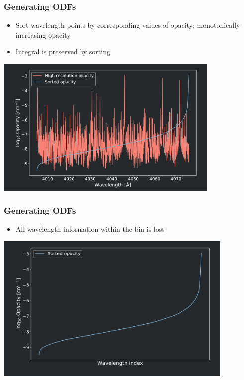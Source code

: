 \frame
{
	\frametitle{Generating ODFs}
	\begin{itemize}
    \item Sort wavelength points by corresponding values of opacity; monotonically increasing opacity
    \item Integral is preserved by sorting
	\end{itemize}		
	\centering
	\includegraphics[width=108mm]{images/odf_generation_process_1}
}

\frame
{
	\frametitle{Generating ODFs}
	\begin{itemize}
		\item All wavelength information within the bin is lost
\end{itemize}		

		\centering
	\includegraphics[width=115mm]{images/odf_generation_process_2}
}

